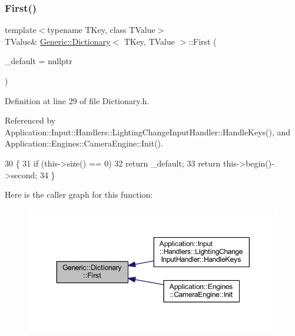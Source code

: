 \subsubsection{\texorpdfstring{First()}{First()}}
{\footnotesize\ttfamily template$<$typename T\+Key, class T\+Value$>$ \\
T\+Value\& \mbox{\hyperlink{classGeneric_1_1Dictionary}{Generic\+::\+Dictionary}}$<$ T\+Key, T\+Value $>$\+::First (\begin{DoxyParamCaption}\item[{T\+Value}]{\+\_\+default = {\ttfamily nullptr} }\end{DoxyParamCaption})\hspace{0.3cm}{\ttfamily [inline]}}



Definition at line 29 of file Dictionary.\+h.



Referenced by Application\+::\+Input\+::\+Handlers\+::\+Lighting\+Change\+Input\+Handler\+::\+Handle\+Keys(), and Application\+::\+Engines\+::\+Camera\+Engine\+::\+Init().


\begin{DoxyCode}
30         \{
31             \textcolor{keywordflow}{if} (this->size() == 0)
32                 \textcolor{keywordflow}{return} \_default;
33             \textcolor{keywordflow}{return} this->begin()->second;
34         \}
\end{DoxyCode}
Here is the caller graph for this function\+:
\nopagebreak
\begin{figure}[H]
\begin{center}
\leavevmode
\includegraphics[width=350pt]{classGeneric_1_1Dictionary_ab368d54de28e7a3514e1add4bb5b3a36_icgraph}
\end{center}
\end{figure}
\mbox{\label{classGeneric_1_1Dictionary_ad018bc166486129b48e9ededce313984}} 
